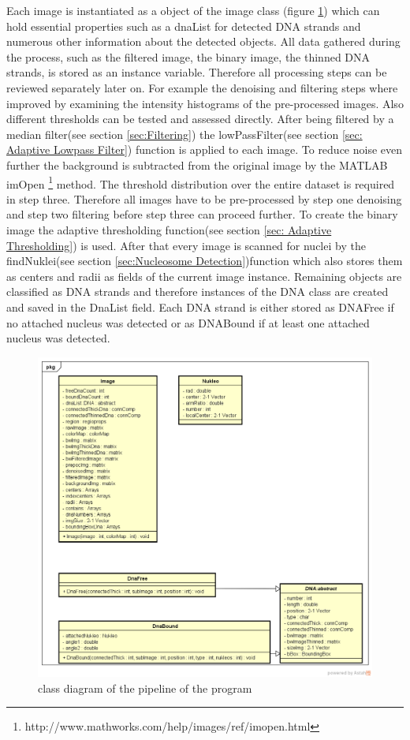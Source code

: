 \documentclass{article}
\begin{document}
Each image is instantiated as a object of the image class (figure \ref{fig:ClassDiagram}) which can hold essential properties such as a dnaList for detected DNA strands and numerous other information about the detected objects.
All data gathered during the process, such as the filtered image, the binary image, the thinned DNA strands, is stored as an instance variable.
Therefore all processing steps can be reviewed separately later on.
For example the denoising and filtering steps where improved by examining the intensity histograms of the pre-processed images.
Also different thresholds can be tested and assessed directly.
After being filtered by a median filter(see section \ref{sec:Filtering}) the lowPassFilter(see section \ref{sec: Adaptive Lowpass Filter}) function is applied to each image. 
To reduce noise even further the background is subtracted from the original image by the MATLAB imOpen \footnote{http://www.mathworks.com/help/images/ref/imopen.html} method.
The threshold distribution over the entire dataset is required in step three. Therefore all images have to be pre-processed by step one denoising and step two filtering before step three can proceed further. 
To create the binary image the adaptive thresholding function(see section \ref{sec: Adaptive Thresholding}) is used.
After that every image is scanned for nuclei by the findNuklei(see section \ref{sec:Nucleosome Detection})function which also stores them as centers and radii as fields of the current image instance.
Remaining objects are classified as DNA strands and therefore instances of the DNA class are created and saved in the DnaList field.
Each DNA strand is either stored as DNAFree if no attached nucleus was detected or as DNABound if at least one attached nucleus was detected.
\begin{figure}[!ht]
	
	\includegraphics[width=1\linewidth]{ClassDiagram.png}
	
	\caption{class diagram of the pipeline of the program} %
	\label{fig:ClassDiagram} %
\end{figure}
\end{document}

